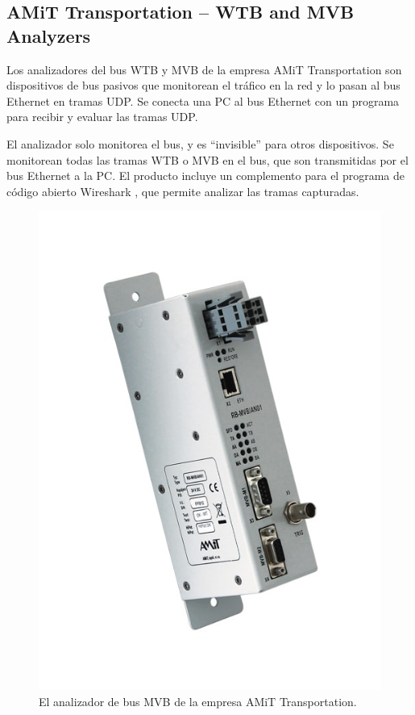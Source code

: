\subsection{AMiT Transportation -- WTB and MVB Analyzers}

Los analizadores del bus WTB y MVB de la empresa AMiT Transportation \cite{amit} son dispositivos de bus pasivos que monitorean el tráfico en la red y lo pasan al bus Ethernet en tramas UDP. Se conecta una PC al bus Ethernet con un programa para recibir y evaluar las tramas UDP.

El analizador solo monitorea el bus, y es ``invisible'' para otros dispositivos. Se monitorean todas las tramas WTB o MVB en el bus, que son transmitidas por el bus Ethernet a la PC. El producto incluye un complemento para el programa de código abierto Wireshark \cite{wireshark}, que permite analizar las tramas capturadas.

\begin{figure}[htbp]
	\centering
	\includegraphics[height=20\baselineskip]{./Figures/amit.jpg}
	\caption[AMiT Transportation -- WTB and MVB Analyzers]{El analizador de bus MVB de la empresa AMiT Transportation.}
\end{figure}


